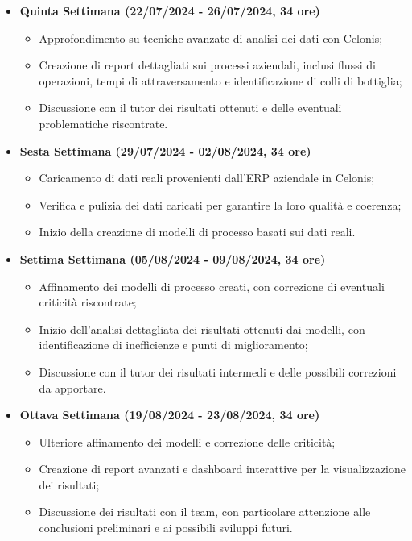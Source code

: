 {\begin{itemize}
    \item \textbf{Quinta Settimana (22/07/2024 - 26/07/2024, 34 ore)}
    \begin{itemize}
        \item Approfondimento su tecniche avanzate di analisi dei dati con Celonis;
        \item Creazione di report dettagliati sui processi aziendali, inclusi flussi di operazioni, tempi di attraversamento e identificazione di colli di bottiglia;
        \item Discussione con il tutor dei risultati ottenuti e delle eventuali problematiche riscontrate.
    \end{itemize}

    \item \textbf{Sesta Settimana (29/07/2024 - 02/08/2024, 34 ore)}
    \begin{itemize}
        \item Caricamento di dati reali provenienti dall'ERP aziendale in Celonis;
        \item Verifica e pulizia dei dati caricati per garantire la loro qualità e coerenza;
        \item Inizio della creazione di modelli di processo basati sui dati reali.
    \end{itemize}

    \item \textbf{Settima Settimana (05/08/2024 - 09/08/2024, 34 ore)}
    \begin{itemize}
        \item Affinamento dei modelli di processo creati, con correzione di eventuali criticità riscontrate;
        \item Inizio dell'analisi dettagliata dei risultati ottenuti dai modelli, con identificazione di inefficienze e punti di miglioramento;
        \item Discussione con il tutor dei risultati intermedi e delle possibili correzioni da apportare.
    \end{itemize}

    \item \textbf{Ottava Settimana (19/08/2024 - 23/08/2024, 34 ore)}
    \begin{itemize}
        \item Ulteriore affinamento dei modelli e correzione delle criticità;
        \item Creazione di report avanzati e dashboard interattive per la visualizzazione dei risultati;
        \item Discussione dei risultati con il team, con particolare attenzione alle conclusioni preliminari e ai possibili sviluppi futuri.
    \end{itemize}


\end{itemize}}
